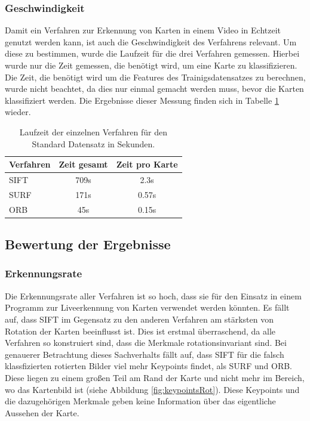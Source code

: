 \subsubsection{Geschwindigkeit}

Damit ein Verfahren zur Erkennung von Karten in einem Video in Echtzeit genutzt werden kann, ist auch die Geschwindigkeit des Verfahrens relevant.
Um diese zu bestimmen, wurde die Laufzeit für die drei Verfahren gemessen. Hierbei wurde nur die Zeit gemessen, die benötigt wird, um eine Karte zu klassifizieren. Die Zeit, die benötigt wird um die Features des Trainigsdatensatzes zu berechnen, wurde nicht beachtet, da dies nur einmal gemacht werden muss, bevor die Karten klassifiziert werden.
Die Ergebnisse dieser Messung finden sich in Tabelle \ref{table:speedResult} wieder.

\begin{table}
\centering
	\begin{tabular}{  l c c   }
	  Verfahren & Zeit gesamt & Zeit pro Karte \\
	  \midrule
	  SIFT & 709s & 2.3s\\
	  SURF & 171s & 0.57s\\ 
	  ORB & 45s & 0.15s \\
	\end{tabular}

\caption{Laufzeit der einzelnen Verfahren für den Standard Datensatz in Sekunden.}
\label{table:speedResult}
\end{table}



\subsection{Bewertung der Ergebnisse}

\subsubsection{Erkennungsrate}

Die Erkennungsrate aller Verfahren ist so hoch, dass sie für den Einsatz in einem Programm zur Liveerkennung von Karten verwendet werden könnten.
Es fällt auf, dass SIFT im Gegensatz zu den anderen Verfahren am stärksten von Rotation der Karten beeinflusst ist. Dies ist erstmal überraschend, da alle Verfahren so konstruiert sind, dass die Merkmale rotationsinvariant sind.
Bei genauerer Betrachtung dieses Sachverhalts fällt auf, dass SIFT für die falsch klassfizierten rotierten Bilder viel mehr Keypoints findet, als SURF und ORB. 
Diese liegen zu einem großen Teil am Rand der Karte und nicht mehr im Bereich, wo das Kartenbild ist (siehe Abbildung \ref{fig:keypointsRot}).
Diese Keypoints und die dazugehörigen Merkmale geben keine Information über das eigentliche Aussehen der Karte.

